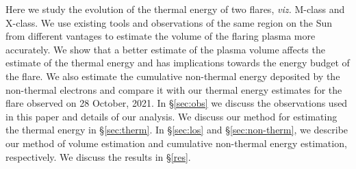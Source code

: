 Here we study the evolution of the thermal energy of two flares, \textit{viz.} M-class and X-class. We use existing tools and observations of the same region on the Sun from different vantages to estimate the volume of the flaring plasma more accurately. We show that a better estimate of the plasma volume affects the estimate of the thermal energy and has implications towards the energy budget of the flare. We also estimate the cumulative non-thermal energy deposited by the non-thermal electrons and compare it with our thermal energy estimates for the flare observed on 28 October, 2021. In \S\ref{sec:obs} we discuss the observations used in this paper and details of our analysis. We discuss our method for estimating the thermal energy in \S\ref{sec:therm}. In \S\ref{sec:los} and \S\ref{sec:non-therm}, we describe our method of volume estimation and cumulative non-thermal energy estimation, respectively. We discuss the results in \S\ref{res}.

